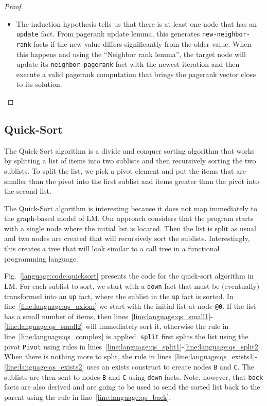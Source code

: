 \begin{proof}
\begin{itemize}
   \item The induction hypothesis tells us that there is at least one node that
   has an \texttt{update} fact. From pagerank update lemma, this
   generates \texttt{new-neighbor-rank} facts if the new value differs
   significantly from the older value. When this happens and using the ``Neighbor
   rank lemma'', the target node will update its \texttt{neighbor-pagerank} fact
   with the newest iteration and then execute a valid pagerank computation that
   brings the pagerank vector close to its solution.

\end{itemize}

\end{proof}

\subsection{Quick-Sort}

The Quick-Sort algorithm is a divide and conquer sorting algorithm that works by splitting
a list of items into two sublists and then recursively sorting the two sublists.
To split the list, we pick a pivot element and put the items that are smaller than the pivot
into the first sublist and items greater than the pivot into the second list.

The Quick-Sort algorithm is interesting because it does not map immediately to
the graph-based model of LM. Our approach considers that the program starts with
a single node where the initial list is located. Then the list is split as usual
and two nodes are created that will recursively sort the sublists.
Interestingly, this creates a tree that will look similar to a call tree in a
functional programming language.

Fig.~\ref{language:code:quicksort} presents the code for the quick-sort
algorithm in LM. For each sublist to sort, we start with a \texttt{down} fact
that must be (eventually) transformed into an \texttt{up} fact, where the
sublist in the \texttt{up} fact is sorted.  In line~\ref{line:language:qs_axiom}
we start with the initial list at node \texttt{@0}. If the list has a small
number of items, then
lines~\ref{line:language:qs_small1}-\ref{line:language:qs_small2} will
immediately sort it, otherwise the rule in line~\ref{line:language:qs_complex} is applied.  \texttt{split}
first splits the list using the pivot \texttt{Pivot} using rules in
lines~\ref{line:language:qs_split1}-\ref{line:language:qs_split2}.
When there is nothing more to split, the rule in
lines~\ref{line:language:qs_exists1}-\ref{line:language:qs_exists2} uses an
exists construct to create nodes \texttt{B} and \texttt{C}. The sublists are
then sent to nodes \texttt{B} and \texttt{C} using \texttt{down} facts.  Note,
however, that \texttt{back} facts are also derived and are going to be used to
send the sorted list back to the parent using the rule in
line~\ref{line:language:qs_back}.

